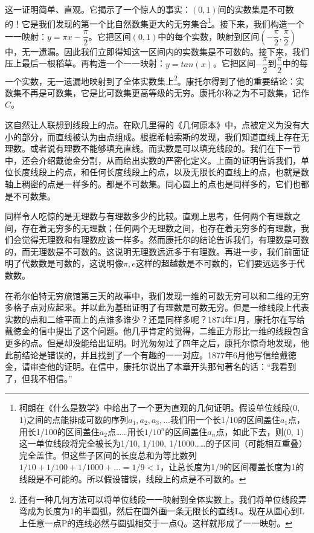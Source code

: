 \documentclass{article}
\begin{document}
这一证明简单、直观。它揭示了一个惊人的事实：$(0, 1)$间的实数集是不可数的！它是我们发现的第一个比自然数集更大的无穷集合\footnote{柯朗在《什么是数学》中给出了一个更为直观的几何证明。假设单位线段(0, 1)之间的点能排成可数的序列$a_1, a_2, a_3, ...$我们用一个长1/10的区间盖住$a_1$点，用长1/100的区间盖住$a_2$点……用长$1/10^n$的区间盖住$a_n$点，如此下去，则(0, 1)这一单位线段将完全被长为1/10, 1/100, 1/1000……的子区间（可能相互重叠）完全盖住。但这些子区间的长度总和为等比数列$1/10 + 1/100 + 1/1000 + ... = 1/9 < 1$，让总长度为1/9的区间覆盖长度为1的线段是不可能的。所以假设错误，线段上的点是不可数的\cite{Courant1969}。}。接下来，我们构造一个一一映射：$y = \pi x - \dfrac{\pi}{2}$。它把区间$(0, 1)$中的每个实数，映射到区间$(-\dfrac{\pi}{2}, \dfrac{\pi}{2})$中，无一遗漏。因此我们立即得知这一区间内的实数集是不可数的。接下来，我们压上最后一根稻草。再构造一个一一映射：$ y = tan(x)$。它把区间$-\dfrac{\pi}{2}$到$\dfrac{\pi}{2}$中的每一个实数，无一遗漏地映射到了全体实数集上\footnote{还有一种几何方法可以将单位线段一一映射到全体实数上。我们将单位线段弄弯成为长度为1的半圆弧，然后在圆外画一条无限长的直线L。现在从圆心到L上任意一点P的连线必然与圆弧相交于一点Q。这样就形成了一一映射。}。康托尔得到了他的重要结论：实数集不再是可数集，它是比可数集更高等级的无穷。康托尔称之为不可数集，记作$C$。

这自然让人联想到线段上的点。在欧几里得的《几何原本》中，点被定义为没有大小的部分，而直线被认为由点组成。根据希帕索斯的发现，我们知道直线上存在无理数。或者说有理数不能够填充直线。而实数是可以填充线段的。我们在下一节中，还会介绍戴徳金分割，从而给出实数的严密化定义。上面的证明告诉我们，单位长度线段上的点，和任何长度线段上的点，以及无限长的直线上的点，也就是数轴上稠密的点是一样多的。都是不可数集。同心圆上的点也是同样多的，它们也都是不可数集。

同样令人吃惊的是无理数与有理数多少的比较。直观上思考，任何两个有理数之间，存在着无穷多的无理数；任何两个无理数之间，也存在着无穷多的有理数，我们会觉得无理数和有理数应该一样多。然而康托尔的结论告诉我们，有理数是可数的，而无理数是不可数的。这说明无理数远远多于有理数。再进一步，我们前面证明了代数数是可数的，这说明像$\pi, e$这样的超越数是不可数的，它们要远远多于代数数。

在希尔伯特无穷旅馆第三天的故事中，我们发现一维的可数无穷可以和二维的无穷多格子点对应起来。并以此为基础证明了有理数是可数无穷。但是一维线段上代表实数的点和二维平面上的点谁多谁少？还是同样多呢？1874年1月，康托尔在写给戴徳金的信中提出了这个问题。他几乎肯定的觉得，二维正方形比一维的线段包含更多的点。但是却没能给出证明。时光匆匆过了四年之后，康托尔惊奇地发现，他此前结论是错误的，并且找到了一个有趣的一一对应。1877年6月他写信给戴徳金，请审查他的证明。在信中，康托尔说出了本章开头那句著名的话：“我看到了，但我不相信。”
\end{document}

